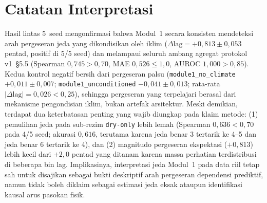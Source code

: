 \documentclass[11pt,a4paper]{article}
\begin{document}
\section{Catatan Interpretasi}
Hasil lintas 5~seed mengonfirmasi bahwa Modul~1 secara konsisten mendeteksi arah pergeseran jeda
yang dikondisikan oleh iklim ($\Delta\text{lag}=+0{,}813\pm 0{,}053$ pentad, positif di 5/5 seed)
dan melampaui seluruh ambang agregat protokol v1~\S5.5 (Spearman $0{,}745>0{,}70$, MAE $0{,}526\le 1{,}0$,
AUROC $1{,}000>0{,}85$). Kedua kontrol negatif bersih dari pergeseran palsu
(\texttt{module1\_no\_climate} $+0{,}011\pm 0{,}007$; \texttt{module1\_unconditioned}
$-0{,}041\pm 0{,}013$; rata-rata $|\Delta\text{lag}|=0{,}026<0{,}25$), sehingga pergeseran yang
terpelajari berasal dari mekanisme pengondisian iklim, bukan artefak arsitektur. Meski demikian,
terdapat dua keterbatasan penting yang wajib diungkap pada klaim metode: (1) pemulihan jeda pada
sub-rezim \texttt{dry-only} lebih lemah (Spearman $0{,}636<0{,}70$ pada 4/5 seed; akurasi $0{,}616$,
terutama karena jeda benar 3 tertarik ke 4--5 dan jeda benar 6 tertarik ke 4), dan (2) magnitudo
pergeseran ekspektasi ($+0{,}813$) lebih kecil dari $+2{,}0$ pentad yang ditanam karena massa
perhatian terdistribusi di beberapa bin lag. Implikasinya, interpretasi jeda Modul~1 pada data
riil tetap sah untuk disajikan sebagai bukti deskriptif arah pergeseran dependensi prediktif,
namun tidak boleh diklaim sebagai estimasi jeda eksak ataupun identifikasi kausal arus pasokan fisik.
\end{document}

